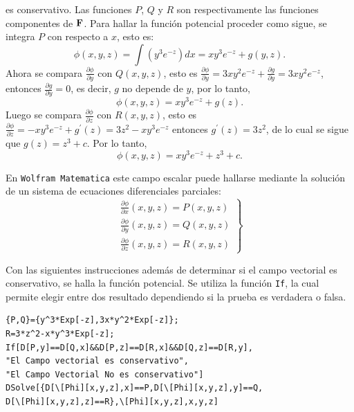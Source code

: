     \begin{ejemplo}
      es conservativo. Las funciones $P$, $Q$ y $R$ son respectivamente las funciones componentes de ${\bf F}$.
      Para hallar la función potencial  proceder como sigue,
      se integra $P$ con respecto a $x$, esto es:
      $$\phi (x,y,z) = \int \left( y^{3}e^{-z}\right)
      dx= xy^{3}e^{-z}+g\left( y,z\right)\!.$$
      Ahora se compara $\frac{\partial \phi }{\partial y}$ con $Q\left(x,y,z\right) $, esto es
      $\frac{\partial \phi }{\partial y}= 3xy^{2}e^{-z}+\frac{\partial g}{\partial y}=3xy^{2}e^{-z}$, entonces
      $\frac{\partial g}{\partial y}=0$, es decir, $g$ no depende de $y$, por lo tanto,
      $$\phi (x,y,z) = xy^{3}e^{-z}+g\left(z\right)\!.$$
      Luego se compara $\frac{\partial \phi }{\partial z}$ con
      $R(x,y,z)$, esto es $\frac{\partial \phi }{\partial z}= -xy^{3}e^{-z}+g^{\prime}(z) = 3z^{2}-xy^{3}e^{-z}$
      entonces $g^{\prime}\left( z\right) =3z^{2}$, de lo cual se sigue que $g\left( z\right) =z^{3}+c$. Por lo tanto,
      $$\phi (x,y,z) = xy^{3}e^{-z}+z^{3}+c.$$
    \end{ejemplo}

    En \verb"Wolfram Matematica" este campo escalar puede hallarse mediante la solución de
    un sistema de ecuaciones diferenciales parciales:
    $$\left.
    \begin{array}{c}
      \frac{\partial \phi }{\partial x}(x,y,z)=P(x,y,z) \\[0.15cm]
      \frac{\partial \phi }{\partial y}(x,y,z) =Q(x,y,z) \\[0.15cm]
      \frac{\partial \phi }{\partial z}(x,y,z) =R(x,y,z)
    \end{array}%
  \right\} $$

  Con las siguientes instrucciones además de determinar si el campo vectorial es conservativo, se halla la función potencial.
  Se utiliza la función \verb"If", la cual permite elegir entre dos resultado dependiendo si la prueba es verdadera o falsa. 

  \begin{tcolorbox}[title=Instrucciones en Mathematica]
\begin{Verbatim}[formatcom=\letraverbatim]
{P,Q}={y^3*Exp[-z],3x*y^2*Exp[-z]};
R=3*z^2-x*y^3*Exp[-z];
If[D[P,y]==D[Q,x]&&D[P,z]==D[R,x]&&D[Q,z]==D[R,y],
"El Campo vectorial es conservativo",
"El Campo Vectorial No es conservativo"]
DSolve[{D[\[Phi][x,y,z],x]==P,D[\[Phi][x,y,z],y]==Q,
D[\[Phi][x,y,z],z]==R},\[Phi][x,y,z],x,y,z]
\end{Verbatim}
  \end{tcolorbox}
  \newpage